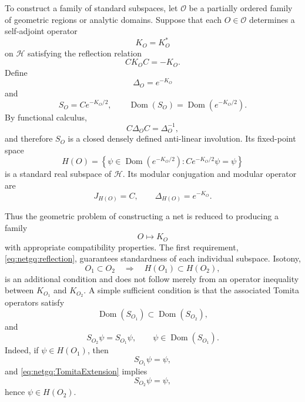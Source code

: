 \documentclass[a4paper,11pt]{article}
\theoremstyle{definition}
\newcommand{\cH}{\mathcal{H}}
\newcommand{\Dom}{\operatorname{Dom}}
\begin{document}
To construct a family of standard subspaces, let $\mathcal O$ be a partially
ordered family of geometric regions or analytic domains.  Suppose that each
$O\in\mathcal O$ determines a self-adjoint operator
\begin{equation}
    K_O=K_O^*
\end{equation}
on $\cH$ satisfying the reflection relation
\begin{equation}
    CK_OC=-K_O.
    \label{eq:netgq:reflection}
\end{equation}
Define
\begin{equation}
    \Delta_O=e^{-K_O}
\end{equation}
and
\begin{equation}
    S_O
    =
    Ce^{-K_O/2},
    \qquad
    \Dom(S_O)=\Dom(e^{-K_O/2}).
\end{equation}
By functional calculus,
\begin{equation}
    C\Delta_OC
    =
    \Delta_O^{-1},
\end{equation}
and therefore $S_O$ is a closed densely defined anti-linear involution.
Its fixed-point space
\begin{equation}
    \boxed{
    H(O)
    =
    \left\{
    \psi\in\Dom(e^{-K_O/2}):
    Ce^{-K_O/2}\psi=\psi
    \right\}
    }
    \label{eq:netgq:HO}
\end{equation}
is a standard real subspace of $\cH$.  Its modular conjugation and modular
operator are
\begin{equation}
    J_{H(O)}=C,
    \qquad
    \Delta_{H(O)}=e^{-K_O}.
\end{equation}

Thus the geometric problem of constructing a net is reduced to producing a
family
\begin{equation}
    O\longmapsto K_O
\end{equation}
with appropriate compatibility properties.  The first requirement,
\eqref{eq:netgq:reflection}, guarantees standardness of each individual
subspace.  Isotony,
\begin{equation}
    O_1\subset O_2
    \quad\Longrightarrow\quad
    H(O_1)\subset H(O_2),
    \label{eq:netgq:isotony}
\end{equation}
is an additional condition and does not follow merely from an operator
inequality between $K_{O_1}$ and $K_{O_2}$.  A simple sufficient condition is
that the associated Tomita operators satisfy
\begin{equation}
    \Dom(S_{O_1})
    \subset
    \Dom(S_{O_2}),
\end{equation}
and
\begin{equation}
    S_{O_2}\psi
    =
    S_{O_1}\psi,
    \qquad
    \psi\in\Dom(S_{O_1}).
    \label{eq:netgq:TomitaExtension}
\end{equation}
Indeed, if $\psi\in H(O_1)$, then
\begin{equation}
    S_{O_1}\psi=\psi,
\end{equation}
and \eqref{eq:netgq:TomitaExtension} implies
\begin{equation}
    S_{O_2}\psi=\psi,
\end{equation}
hence $\psi\in H(O_2)$.
\end{document}
